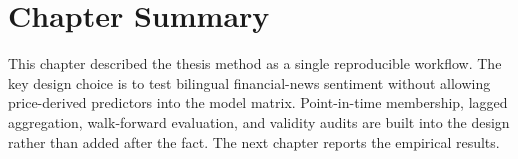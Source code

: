 \section{Chapter Summary}

This chapter described the thesis method as a single reproducible workflow. The key design choice is to test bilingual financial-news sentiment without allowing price-derived predictors into the model matrix. Point-in-time membership, lagged aggregation, walk-forward evaluation, and validity audits are built into the design rather than added after the fact. The next chapter reports the empirical results.
